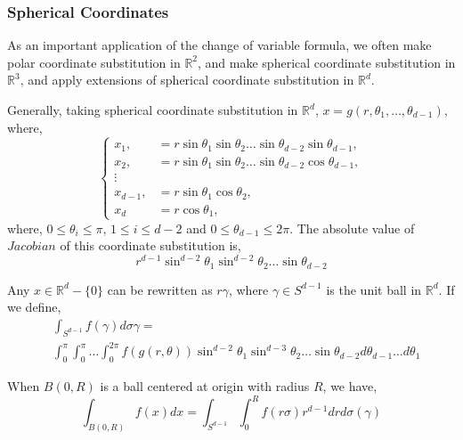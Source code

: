 \documentclass[a4paper]{article}
\numberwithin{equation}{subsection}
\begin{document}
\subsubsection{Spherical Coordinates}
\par As an important application of the change of variable formula, we often make polar coordinate substitution in $\mathbb{R}^2$, and make spherical coordinate substitution in $\mathbb{R}^3$, and apply extensions of spherical coordinate substitution in $\mathbb{R}^d$.
\par Generally, taking spherical coordinate substitution in $\mathbb{R}^d$, $x = g(r, \theta_1, \dots, \theta_{d-1})$, where,
\begin{equation}
    \begin{cases}
        x_1, & = r\sin \theta_1 \sin \theta_2 \dots \sin \theta_{d-2} \sin \theta_{d-1}, \\
        x_2, & = r\sin \theta_1 \sin \theta_2 \dots \sin \theta_{d-2} \cos \theta_{d-1}, \\
        \vdots \\
        x_{d-1}, & = r\sin \theta_1 \cos \theta_2, \\
        x_d &= r\cos \theta_1,
    \end{cases}
\end{equation}
where, $0 \leq \theta_i \leq \pi$, $1 \leq i \leq d-2$ and $0 \leq \theta_{d-1} \leq 2 \pi$. The absolute value of $Jacobian$ of this coordinate substitution is,
\begin{equation}
    r^{d-1} \sin^{d-2} \theta_1 \sin^{d-2} \theta_2 \dots \sin \theta_{d-2}
\end{equation}

\par Any $x \in \mathbb{R}^d - \{0\}$ can be rewritten as $r \gamma$, where $\gamma \in S^{d-1}$ is the unit ball in $\mathbb{R}^d$. If we define,
\begin{equation}
    \begin{split}
        &\int_{S^{d-1}} f(\gamma)d \sigma{\gamma} = \\
        &\int_{0}^{\pi} \int_{0}^{\pi} \dots \int_{0}^{2\pi} f(g(r, \theta)) \sin^{d-2} \theta_{1} \sin^{d-3} \theta_2 \dots \sin\theta_{d-2} d \theta_{d-1} \dots d\theta_1
    \end{split}
\end{equation}
\par When $B(0, R)$ is a ball centered at origin with radius $R$, we have,
\begin{equation}
    \label{eq:3}
    \int_{B(0, R)} f(x)dx = \int_{S^{d-1}} \int_{0}^{R} f(r\sigma)r^{d-1} dr d\sigma(\gamma)
\end{equation}
\end{document}
